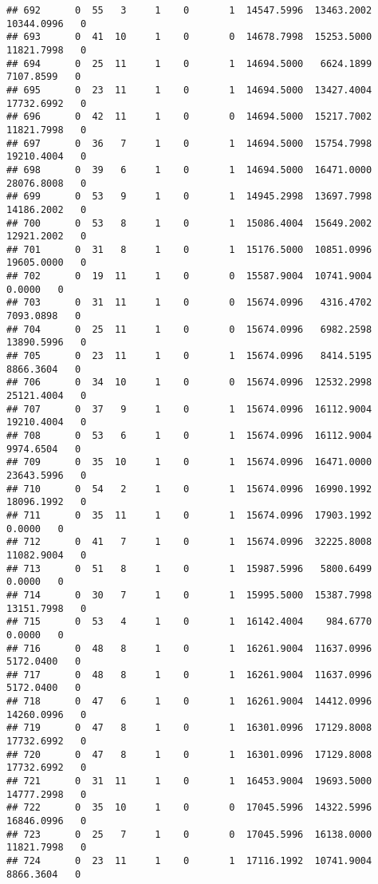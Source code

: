 \documentclass[
]{article}
\begin{document}
\begin{enumerate}
\begin{verbatim}
## 692      0  55   3     1    0       1  14547.5996  13463.2002  10344.0996   0
## 693      0  41  10     1    0       0  14678.7998  15253.5000  11821.7998   0
## 694      0  25  11     1    0       1  14694.5000   6624.1899   7107.8599   0
## 695      0  23  11     1    0       1  14694.5000  13427.4004  17732.6992   0
## 696      0  42  11     1    0       0  14694.5000  15217.7002  11821.7998   0
## 697      0  36   7     1    0       1  14694.5000  15754.7998  19210.4004   0
## 698      0  39   6     1    0       1  14694.5000  16471.0000  28076.8008   0
## 699      0  53   9     1    0       1  14945.2998  13697.7998  14186.2002   0
## 700      0  53   8     1    0       1  15086.4004  15649.2002  12921.2002   0
## 701      0  31   8     1    0       1  15176.5000  10851.0996  19605.0000   0
## 702      0  19  11     1    0       0  15587.9004  10741.9004      0.0000   0
## 703      0  31  11     1    0       0  15674.0996   4316.4702   7093.0898   0
## 704      0  25  11     1    0       0  15674.0996   6982.2598  13890.5996   0
## 705      0  23  11     1    0       1  15674.0996   8414.5195   8866.3604   0
## 706      0  34  10     1    0       0  15674.0996  12532.2998  25121.4004   0
## 707      0  37   9     1    0       1  15674.0996  16112.9004  19210.4004   0
## 708      0  53   6     1    0       1  15674.0996  16112.9004   9974.6504   0
## 709      0  35  10     1    0       1  15674.0996  16471.0000  23643.5996   0
## 710      0  54   2     1    0       1  15674.0996  16990.1992  18096.1992   0
## 711      0  35  11     1    0       1  15674.0996  17903.1992      0.0000   0
## 712      0  41   7     1    0       1  15674.0996  32225.8008  11082.9004   0
## 713      0  51   8     1    0       1  15987.5996   5800.6499      0.0000   0
## 714      0  30   7     1    0       1  15995.5000  15387.7998  13151.7998   0
## 715      0  53   4     1    0       1  16142.4004    984.6770      0.0000   0
## 716      0  48   8     1    0       1  16261.9004  11637.0996   5172.0400   0
## 717      0  48   8     1    0       1  16261.9004  11637.0996   5172.0400   0
## 718      0  47   6     1    0       1  16261.9004  14412.0996  14260.0996   0
## 719      0  47   8     1    0       1  16301.0996  17129.8008  17732.6992   0
## 720      0  47   8     1    0       1  16301.0996  17129.8008  17732.6992   0
## 721      0  31  11     1    0       1  16453.9004  19693.5000  14777.2998   0
## 722      0  35  10     1    0       0  17045.5996  14322.5996  16846.0996   0
## 723      0  25   7     1    0       0  17045.5996  16138.0000  11821.7998   0
## 724      0  23  11     1    0       1  17116.1992  10741.9004   8866.3604   0

\end{verbatim}
\end{enumerate}
\end{document}
